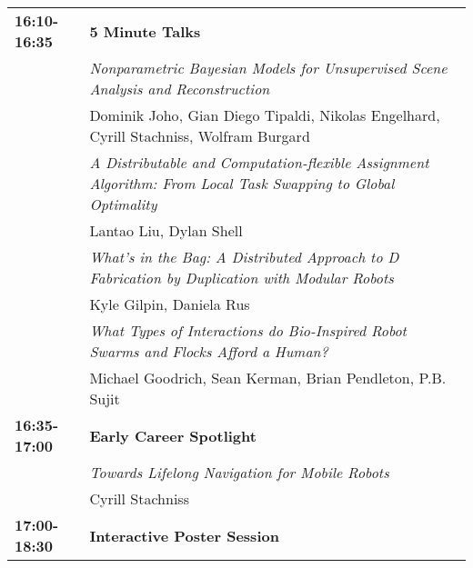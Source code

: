 \begin{tabular}{lp{13.8cm}}
{\bf 16:10-16:35} & {\bf 5 Minute Talks} \\[2mm]
& \em{ Nonparametric Bayesian Models for Unsupervised Scene Analysis and Reconstruction}\\
& Dominik Joho\label{Joho}, Gian Diego Tipaldi, Nikolas Engelhard, Cyrill Stachniss, Wolfram Burgard\\[2mm]
& \em{ A Distributable and Computation-flexible Assignment Algorithm: From Local Task Swapping to Global Optimality}\\
& Lantao Liu\label{Liu}, Dylan Shell\\[2mm]
& \em{ What's in the Bag: A Distributed Approach to D Fabrication by Duplication with Modular Robots}\\
& Kyle Gilpin\label{Gilpin}, Daniela Rus\\[2mm]
& \em{ What Types of Interactions do Bio-Inspired Robot Swarms and Flocks Afford a Human?}\\
& Michael Goodrich\label{Goodrich}, Sean Kerman, Brian Pendleton, P.B. Sujit\\[2mm]



{\bf 16:35-17:00} & {\bf Early Career Spotlight} \\[2mm]
& \em{Towards Lifelong Navigation for Mobile Robots}\\
& Cyrill Stachniss\\[2mm]

{\bf 17:00-18:30} & {\bf Interactive Poster Session} \\[2mm]
\end{tabular}




